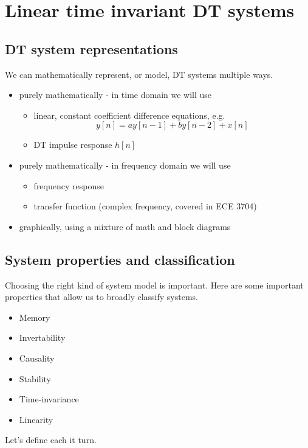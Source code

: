 \chapter{Linear time invariant DT systems}

\section{DT system representations}

We can mathematically represent, or model, DT systems multiple ways.

\begin{itemize}
\item purely mathematically - in time domain we will use

  \begin{itemize}
  \item linear, constant coefficient difference equations, e.g.
    \[
    y[n] = a y[n-1] + b y[n-2] + x[n]
    \]
  \item DT impulse response $h[n]$
  \end{itemize}
\item purely mathematically - in frequency domain we will use
  \begin{itemize}
  \item frequency response
  \item transfer function (complex frequency, covered in ECE 3704)
  \end{itemize}
\item graphically, using a mixture of math and block diagrams
\end{itemize}

\section{System properties and classification}

Choosing the right kind of system model is important. Here are some important properties that allow us to broadly classify systems.
\begin{itemize}
\item Memory
\item Invertability
\item Causality
\item Stability
\item Time-invariance
\item Linearity
\end{itemize}

Let's define each it turn.

